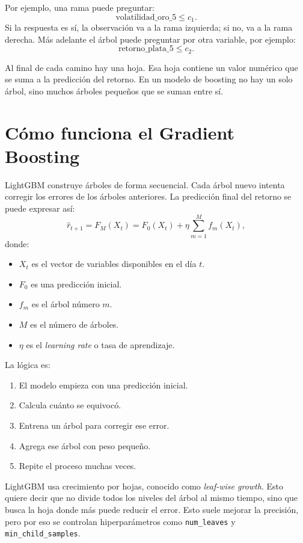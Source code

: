 \documentclass[12pt,letterpaper]{article}
\begin{document}
Por ejemplo, una rama puede preguntar:
\begin{equation}
\text{volatilidad\_oro\_5} \leq c_1.
\end{equation}
Si la respuesta es sí, la observación va a la rama izquierda; si no, va a la rama derecha. Más adelante el árbol puede preguntar por otra variable, por ejemplo:
\begin{equation}
\text{retorno\_plata\_5} \leq c_2.
\end{equation}

Al final de cada camino hay una hoja. Esa hoja contiene un valor numérico que se suma a la predicción del retorno. En un modelo de boosting no hay un solo árbol, sino muchos árboles pequeños que se suman entre sí.

\section{Cómo funciona el Gradient Boosting}
LightGBM construye árboles de forma secuencial. Cada árbol nuevo intenta corregir los errores de los árboles anteriores. La predicción final del retorno se puede expresar así:
\begin{equation}
\hat{r}_{t+1}=F_M(X_t)=F_0(X_t)+\eta\sum_{m=1}^{M} f_m(X_t),
\end{equation}
donde:
\begin{itemize}
    \item $X_t$ es el vector de variables disponibles en el día $t$.
    \item $F_0$ es una predicción inicial.
    \item $f_m$ es el árbol número $m$.
    \item $M$ es el número de árboles.
    \item $\eta$ es el \textit{learning rate} o tasa de aprendizaje.
\end{itemize}

La lógica es:
\begin{enumerate}
    \item El modelo empieza con una predicción inicial.
    \item Calcula cuánto se equivocó.
    \item Entrena un árbol para corregir ese error.
    \item Agrega ese árbol con peso pequeño.
    \item Repite el proceso muchas veces.
\end{enumerate}

LightGBM usa crecimiento por hojas, conocido como \textit{leaf-wise growth}. Esto quiere decir que no divide todos los niveles del árbol al mismo tiempo, sino que busca la hoja donde más puede reducir el error. Esto suele mejorar la precisión, pero por eso se controlan hiperparámetros como \texttt{num\_leaves} y \texttt{min\_child\_samples}.
\end{document}
